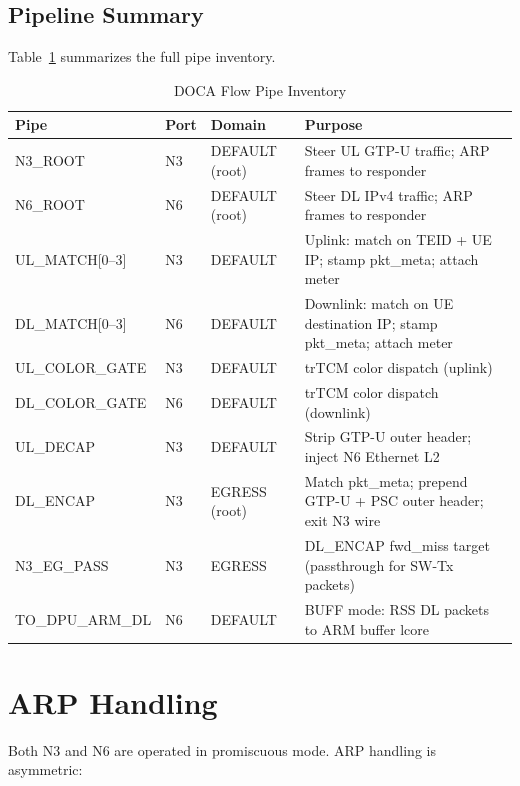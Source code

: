 \documentclass[conference]{IEEEtran}
\begin{document}
\subsection{Pipeline Summary}

Table~\ref{tab:pipeline} summarizes the full pipe inventory.

\begin{table}[t]
  \centering
  \caption{DOCA Flow Pipe Inventory}
  \label{tab:pipeline}
  \begin{tabular}{@{}llll@{}}
    \toprule
    Pipe & Port & Domain & Purpose \\
    \midrule
    N3\_ROOT          & N3    & DEFAULT (root) & Steer UL GTP-U traffic; ARP frames to responder \\
    N6\_ROOT          & N6    & DEFAULT (root) & Steer DL IPv4 traffic; ARP frames to responder \\
    UL\_MATCH[0--3]   & N3    & DEFAULT        & Uplink: match on TEID + UE IP; stamp pkt\_meta; attach meter \\
    DL\_MATCH[0--3]   & N6    & DEFAULT        & Downlink: match on UE destination IP; stamp pkt\_meta; attach meter \\
    UL\_COLOR\_GATE   & N3    & DEFAULT        & trTCM color dispatch (uplink) \\
    DL\_COLOR\_GATE   & N6    & DEFAULT        & trTCM color dispatch (downlink) \\
    UL\_DECAP         & N3    & DEFAULT        & Strip GTP-U outer header; inject N6 Ethernet L2 \\
    DL\_ENCAP         & N3    & EGRESS (root)  & Match pkt\_meta; prepend GTP-U + PSC outer header; exit N3 wire \\
    N3\_EG\_PASS      & N3    & EGRESS         & DL\_ENCAP fwd\_miss target (passthrough for SW-Tx packets) \\
    TO\_DPU\_ARM\_DL  & N6    & DEFAULT        & BUFF mode: RSS DL packets to ARM buffer lcore \\
    \bottomrule
  \end{tabular}
\end{table}

\section{ARP Handling}

Both N3 and N6 are operated in promiscuous mode.  ARP handling is
asymmetric:
\end{document}
